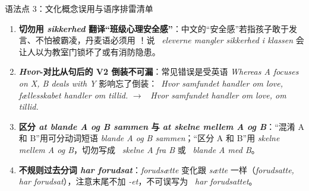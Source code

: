 \begin{grammatikbox}{语法点 3：文化概念误用与语序排雷清单}
\begin{enumerate}
  \item \textbf{ 切勿用 \textit{sikkerhed} 翻译“班级心理安全感”}：中文的“安全感”若指孩子敢于发言、不怕被霸凌，丹麦语必须用 ！说 \ \textit{eleverne mangler sikkerhed i klassen} 会让人以为教室门锁坏了或有消防隐患。
  \item \textbf{ \textit{Hvor}-对比从句后的 V2 倒装不可漏}：常见错误是受英语 \textit{Whereas A focuses on X, B deals with Y} 影响忘了倒装：\ \textit{Hvor samfundet handler om love, fællesskabet handler om tillid.} $\rightarrow$ \ \textit{Hvor samfundet handler om love,  om tillid.}
  \item \textbf{ 区分 \textit{at blande A og B sammen} 与 \textit{at skelne mellem A og B}}：“混淆 A 和 B”用可分动词短语 \textit{blande A og B sammen}；“区分 A 和 B”用 \textit{skelne mellem A og B}，切勿写成 \ \textit{skelne A fra B} 或 \ \textit{blande A med B}。
  \item \textbf{ 不规则过去分词 \textit{har forudsat}}：\textit{forudsætte} 变化跟 \textit{sætte} 一样（\textit{forudsatte, har forudsat}），注意末尾不加 \textit{-et}，不可误写为 \ \textit{har forudsattet}。
\end{enumerate}
\end{grammatikbox}


